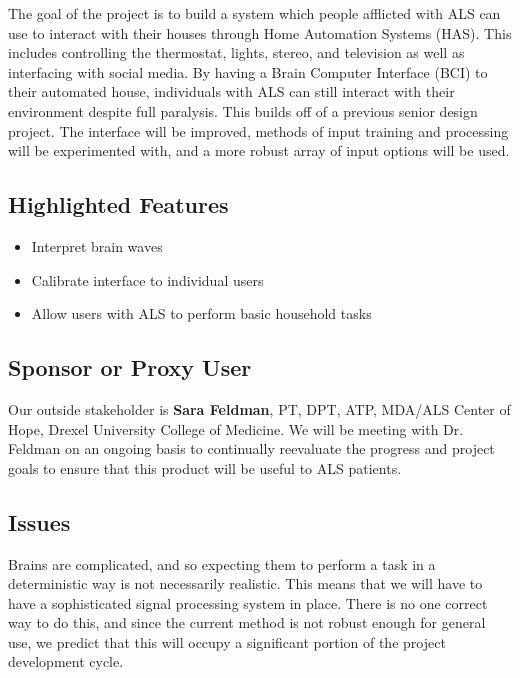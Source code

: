 \documentclass{report}
\begin{document}
The goal of the project is to build a system which people afflicted with ALS
can use to interact with their houses through Home Automation Systems (HAS).
This includes controlling the thermostat, lights, stereo, and television as
well as interfacing with social media. By having a Brain Computer Interface
(BCI) to their automated house, individuals with ALS can still interact with
their environment despite full paralysis. This builds off of a previous
senior design project. The interface will be improved, methods of
input training and processing will be experimented with, and a more robust
array of input options will be used.


\subsection*{Highlighted Features}

\begin{itemize}
\item Interpret brain waves
\item Calibrate interface to individual users
\item Allow users with ALS to perform basic household tasks
\end{itemize}

\subsection*{Sponsor or Proxy User}

Our outside stakeholder is \textbf{Sara Feldman}, PT, DPT, ATP, MDA/ALS Center
of Hope, Drexel University College of Medicine. We will be meeting with Dr.
Feldman on an ongoing basis to continually reevaluate the progress and
project goals to ensure that this product will be useful to ALS patients.

\subsection*{Issues}

Brains are complicated, and so expecting them to perform a task in a
deterministic way is not necessarily realistic. This means that we will have
to have a sophisticated signal processing system in place. There is no one
correct way to do this, and since the current method is not robust enough
for general use, we predict that this will occupy a significant portion of
the project development cycle.
\end{document}
